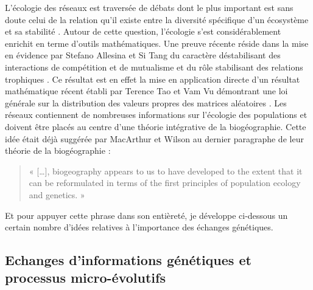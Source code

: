 L'écologie des réseaux est traversée de débats dont le plus important
est sans doute celui de la relation qu'il existe entre la diversité
spécifique d'un écosystème et sa stabilité \citep{May1973, McCann2000}.
Autour de cette question, l'écologie s'est considérablement enrichit en
terme d'outils mathématiques. Une preuve récente réside dans la mise en
évidence par Stefano Allesina et Si Tang du caractère déstabilisant des
interactions de compétition et de mutualisme et du rôle stabilisant des
relations trophiques \citep{Allesina2012a}. Ce résultat est en effet la
mise en application directe d'un résultat mathématique récent établi par
Terence Tao et Vam Vu démontrant une loi générale sur la distribution
des valeurs propres des matrices aléatoires \citep{Tao2010}. Les réseaux
contiennent de nombreuses informations sur l'écologie des populations et
doivent être placés au centre d'une théorie intégrative de la
biogéographie. Cette idée était déjà suggérée par MacArthur et Wilson au
dernier paragraphe de leur théorie de la biogéographie
\citep{MacArthur1967} :

\begin{quote}
« {[}\ldots{}{]}, biogeography appears to us to have developed to the
extent that it can be reformulated in terms of the first principles of
population ecology and genetics. »
\end{quote}

Et pour appuyer cette phrase dans son entièreté, je développe ci-dessous
un certain nombre d'idées relatives à l'importance des échanges
génétiques.

\subsection*{Echanges d'informations génétiques et processus
micro-évolutifs}\label{echanges-dinformations-guxe9nuxe9tiques-et-processus-micro-uxe9volutifs}

